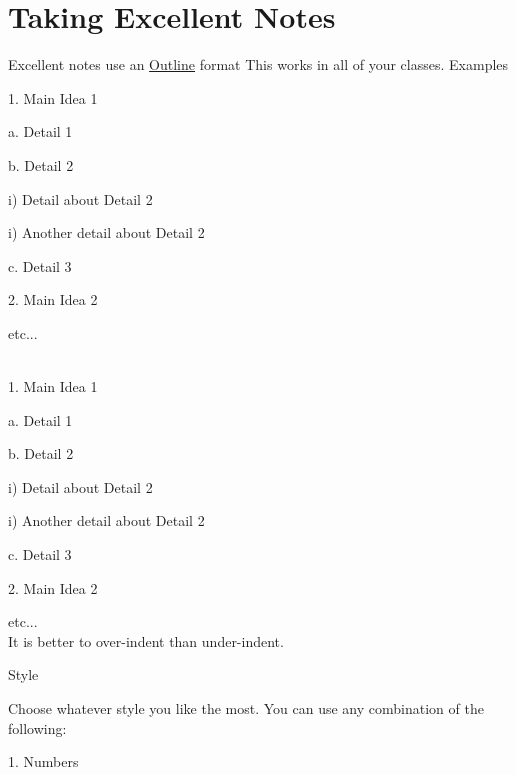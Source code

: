 \documentclass[../main.tex]{subfiles}
\begin{document}
\chapter{Taking Excellent Notes}

\begin{outline}[enumerate]

\1 Excellent notes use an \underline{Outline} format
	\2	
	\2 This works in all of your classes.
\1 Examples
	\2 \\



	1. Main Idea 1

	\quad a. Detail 1

	\quad b. Detail 2


	\quad \quad i) Detail about Detail 2

	\quad \quad i) Another detail about Detail 2

	\quad c. Detail 3

	2. Main Idea 2

	etc...\\

	\2 \\


	1. Main Idea 1

	a. Detail 1

	b. Detail 2

	i) Detail about Detail 2

	i) Another detail about Detail 2

	c. Detail 3

	2. Main Idea 2

	etc...\\


	\1 It is better to over-indent than under-indent.

	\1 Style

		\2 Choose whatever style you like the most.  You can use any combination of the following:

	\begin{displayquote}

	1. Numbers


\end{displayquote}
\end{outline}
\end{document}
